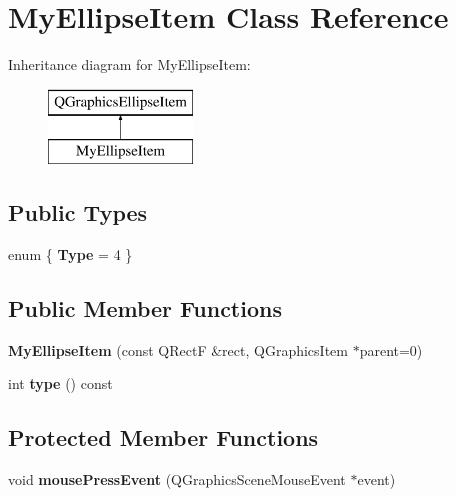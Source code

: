 \hypertarget{class_my_ellipse_item}{}\section{My\+Ellipse\+Item Class Reference}
\label{class_my_ellipse_item}
Inheritance diagram for My\+Ellipse\+Item\+:\begin{figure}[H]
\begin{center}
\leavevmode
\includegraphics[height=2.000000cm]{class_my_ellipse_item}
\end{center}
\end{figure}
\subsection*{Public Types}
\begin{DoxyCompactItemize}
\item 
\hypertarget{class_my_ellipse_item_ab3d7ea5bd2ccd432ae8969dc1f733edc}{}enum \{ {\bfseries Type} = 4
 \}\label{class_my_ellipse_item_ab3d7ea5bd2ccd432ae8969dc1f733edc}

\end{DoxyCompactItemize}
\subsection*{Public Member Functions}
\begin{DoxyCompactItemize}
\item 
\hypertarget{class_my_ellipse_item_a781d85f2fdfd5a843cb28bc67993b228}{}{\bfseries My\+Ellipse\+Item} (const Q\+Rect\+F \&rect, Q\+Graphics\+Item $\ast$parent=0)\label{class_my_ellipse_item_a781d85f2fdfd5a843cb28bc67993b228}

\item 
\hypertarget{class_my_ellipse_item_a7188e1d0368309413fcc30e8e528bed9}{}int {\bfseries type} () const \label{class_my_ellipse_item_a7188e1d0368309413fcc30e8e528bed9}

\end{DoxyCompactItemize}
\subsection*{Protected Member Functions}
\begin{DoxyCompactItemize}
\item 
\hypertarget{class_my_ellipse_item_a0ead6a18fca86196833f8d7fbd225ee5}{}void {\bfseries mouse\+Press\+Event} (Q\+Graphics\+Scene\+Mouse\+Event $\ast$event)\label{class_my_ellipse_item_a0ead6a18fca86196833f8d7fbd225ee5}

\end{DoxyCompactItemize}
